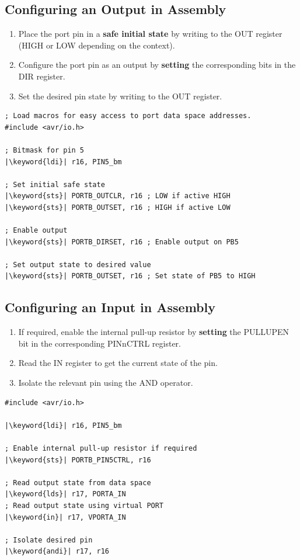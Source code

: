 \documentclass{report}
\newcommand{\keyword}[1]{\textcolor[rgb]{0.00,0.50,0.00}{\textbf{#1}}}
\begin{document}
\subsection{Configuring an Output in Assembly}
\begin{enumerate}
    \item Place the port pin in a \textbf{safe initial state}
          by writing to the OUT register (HIGH or LOW depending on the context).
    \item Configure the port pin as an output by \textbf{setting} the corresponding bits in the DIR register.
    \item Set the desired pin state by writing to the OUT register.
\end{enumerate}
\begin{verbatim}
; Load macros for easy access to port data space addresses.
#include <avr/io.h>

; Bitmask for pin 5
|\keyword{ldi}| r16, PIN5_bm

; Set initial safe state
|\keyword{sts}| PORTB_OUTCLR, r16 ; LOW if active HIGH
|\keyword{sts}| PORTB_OUTSET, r16 ; HIGH if active LOW

; Enable output
|\keyword{sts}| PORTB_DIRSET, r16 ; Enable output on PB5

; Set output state to desired value
|\keyword{sts}| PORTB_OUTSET, r16 ; Set state of PB5 to HIGH
\end{verbatim}
\subsection{Configuring an Input in Assembly}
\begin{enumerate}
    \item If required, enable the internal pull-up resistor by \textbf{setting}
          the PULLUPEN bit in the \linebreak corresponding PINnCTRL register.
    \item Read the IN register to get the current state of the pin.
    \item Isolate the relevant pin using the AND operator.
\end{enumerate}
\begin{verbatim}
#include <avr/io.h>

|\keyword{ldi}| r16, PIN5_bm

; Enable internal pull-up resistor if required
|\keyword{sts}| PORTB_PIN5CTRL, r16

; Read output state from data space
|\keyword{lds}| r17, PORTA_IN
; Read output state using virtual PORT
|\keyword{in}| r17, VPORTA_IN

; Isolate desired pin
|\keyword{andi}| r17, r16
\end{verbatim}
\end{document}
